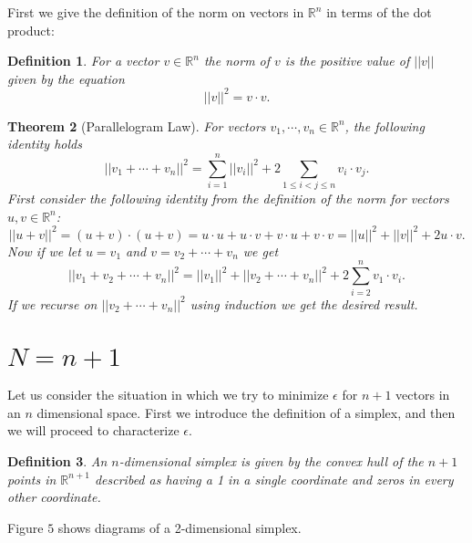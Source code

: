 \documentclass[11pt,letterpaper,twoside,english]{article}
\theoremstyle{theorem}
\newtheorem{theorem}{Theorem}[section]
\newtheorem{definition}[theorem]{Definition}
\theoremstyle{remark}
\providecommand{\R}{\mathbb{R}}
\begin{document}
First we give the definition of the norm on vectors in $\R^n$ in terms of the dot product:

\begin{definition}
For a vector $v\in\R^n$ the norm of $v$ is the positive value of $||v||$ given by the equation
$$
||v||^2=v\cdot v.
$$
\end{definition}
\begin{theorem}[Parallelogram Law]
For vectors $v_1,\cdots,v_n\in\R^n$, the following identity holds
$$
||v_1+\cdots+v_n||^2=\displaystyle\sum_{i=1}^n||v_i||^2+2\displaystyle\sum_{1\le i<j\le n}v_i\cdot v_j.
$$
\proof
First consider the following identity from the definition of the norm for vectors $u,v\in\R^n$:
$$
||u+v||^2=(u+v)\cdot (u+v)=u\cdot u+u\cdot v+ v\cdot u + v\cdot v=||u||^2+||v||^2+2u\cdot v.
$$
Now if we let $u=v_1$ and $v= v_2+\cdots+v_n$ we get 
$$
||v_1+v_2+\cdots+v_n||^2=||v_1||^2+||v_2+\cdots +v_n||^2+2\sum_{i=2}^n v_1\cdot v_i.
$$
If we recurse on $||v_2+\cdots +v_n||^2$ using induction we get the desired result. 
\end{theorem}


\section{$N = n+1$}
Let us consider the situation in which we try to minimize $\epsilon$ for $n+1$ vectors in an $n$ dimensional space. First we introduce the definition of a simplex, and then we will proceed to characterize $\epsilon$. 

\begin{definition}
An $n$-dimensional simplex is given by the convex hull of the $n+1$ points in $\R^{n+1}$ described as having a 1 in a single coordinate and zeros in every other coordinate. 
\end{definition}

Figure $5$ shows diagrams of a 2-dimensional simplex.
\end{document}
